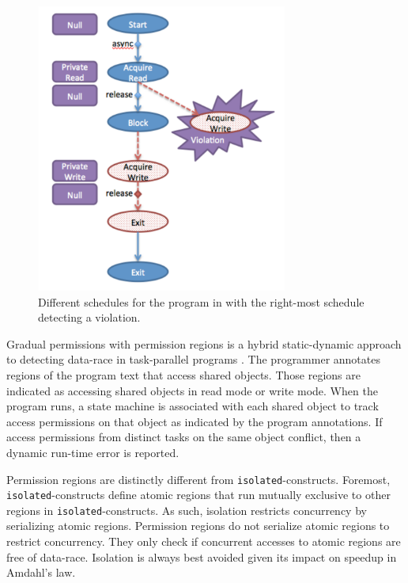 \begin{figure}[t]
\centering
\includegraphics[width=3.25in]{../figs/stack-violation}
\caption{Different schedules for the program in  with the right-most schedule detecting a violation.}
\label{fig:permission-violation-state}
\end{figure}

Gradual permissions with permission regions is a hybrid
static-dynamic approach to detecting data-race in task-parallel
programs \cite{Westbrook:2011:PRR:2341616.2341627,hj-grad-perm}. The
programmer annotates regions of the program text that access shared
objects. Those regions are indicated as accessing shared objects in
read mode or write mode. When the program runs, a state machine is
associated with each shared object to track access permissions on that
object as indicated by the program annotations. If access permissions
from distinct tasks on the same object conflict, then a dynamic run-time
error is reported.

Permission regions are distinctly different from
\texttt{isolated}-constructs. Foremost, \texttt{isolated}-constructs define atomic regions that run mutually
exclusive to other regions in \texttt{isolated}-constructs. As such, isolation
restricts concurrency by serializing atomic regions. Permission regions
do not serialize atomic regions to restrict concurrency. They only
check if concurrent accesses to atomic regions are free of data-race. Isolation is
always best avoided given its impact on speedup in Amdahl's law.

